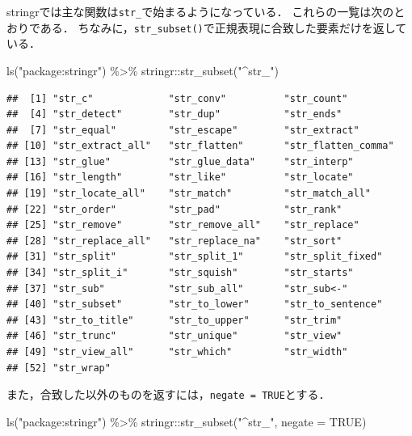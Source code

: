 \documentclass[
]{article}
\newenvironment{Shaded}{\begin{snugshade}}{\end{snugshade}}
\newcommand{\AttributeTok}[1]{\textcolor[rgb]{0.77,0.63,0.00}{#1}}
\newcommand{\ConstantTok}[1]{\textcolor[rgb]{0.00,0.00,0.00}{#1}}
\newcommand{\FunctionTok}[1]{\textcolor[rgb]{0.00,0.00,0.00}{#1}}
\newcommand{\NormalTok}[1]{#1}
\newcommand{\SpecialCharTok}[1]{\textcolor[rgb]{0.00,0.00,0.00}{#1}}
\newcommand{\StringTok}[1]{\textcolor[rgb]{0.31,0.60,0.02}{#1}}
\begin{document}
stringrでは主な関数は\texttt{str\_}で始まるようになっている．
これらの一覧は次のとおりである．
ちなみに，\texttt{str\_subset()}で正規表現に合致した要素だけを返している．

\begin{Shaded}
\begin{Highlighting}[]
\FunctionTok{ls}\NormalTok{(}\StringTok{"package:stringr"}\NormalTok{) }\SpecialCharTok{\%\textgreater{}\%}
\NormalTok{  stringr}\SpecialCharTok{::}\FunctionTok{str\_subset}\NormalTok{(}\StringTok{"\^{}str\_"}\NormalTok{)}
\end{Highlighting}
\end{Shaded}

\begin{verbatim}
##  [1] "str_c"             "str_conv"          "str_count"        
##  [4] "str_detect"        "str_dup"           "str_ends"         
##  [7] "str_equal"         "str_escape"        "str_extract"      
## [10] "str_extract_all"   "str_flatten"       "str_flatten_comma"
## [13] "str_glue"          "str_glue_data"     "str_interp"       
## [16] "str_length"        "str_like"          "str_locate"       
## [19] "str_locate_all"    "str_match"         "str_match_all"    
## [22] "str_order"         "str_pad"           "str_rank"         
## [25] "str_remove"        "str_remove_all"    "str_replace"      
## [28] "str_replace_all"   "str_replace_na"    "str_sort"         
## [31] "str_split"         "str_split_1"       "str_split_fixed"  
## [34] "str_split_i"       "str_squish"        "str_starts"       
## [37] "str_sub"           "str_sub_all"       "str_sub<-"        
## [40] "str_subset"        "str_to_lower"      "str_to_sentence"  
## [43] "str_to_title"      "str_to_upper"      "str_trim"         
## [46] "str_trunc"         "str_unique"        "str_view"         
## [49] "str_view_all"      "str_which"         "str_width"        
## [52] "str_wrap"
\end{verbatim}

また，合致した以外のものを返すには，\texttt{negate\ =\ TRUE}とする．

\begin{Shaded}
\begin{Highlighting}[]
\FunctionTok{ls}\NormalTok{(}\StringTok{"package:stringr"}\NormalTok{) }\SpecialCharTok{\%\textgreater{}\%}
\NormalTok{  stringr}\SpecialCharTok{::}\FunctionTok{str\_subset}\NormalTok{(}\StringTok{"\^{}str\_"}\NormalTok{, }\AttributeTok{negate =} \ConstantTok{TRUE}\NormalTok{)}
\end{Highlighting}
\end{Shaded}
\end{document}
